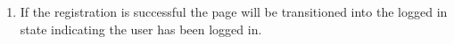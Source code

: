 \documentclass[12pt,a4paper]{article}
\begin{document}
\begin{enumerate}
					\item If the registration is successful the page will be transitioned into the logged in state 
						indicating the user has been logged in.\\\\
				\end{enumerate}
			
			\newpage
\end{document}
